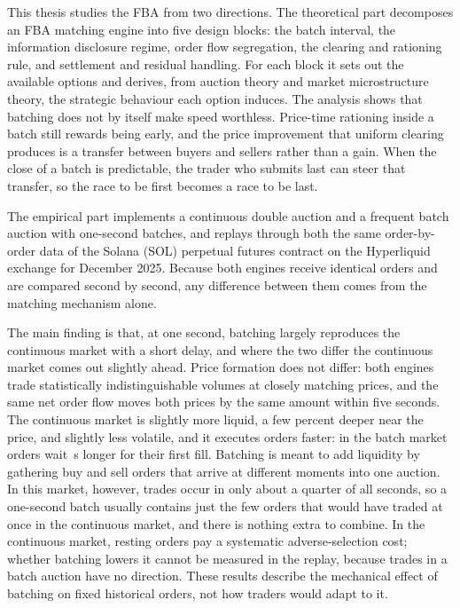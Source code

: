 This thesis studies the FBA from two directions. The theoretical part
decomposes an FBA matching engine into five design blocks: the batch
interval, the information disclosure regime, order flow segregation, the
clearing and rationing rule, and settlement and residual handling. For
each block it sets out the available options and derives, from auction
theory and market microstructure theory, the strategic behaviour each
option induces. The analysis shows that batching does not by itself make
speed worthless. Price-time rationing inside a batch still rewards being
early, and the price improvement that uniform clearing produces is a
transfer between buyers and sellers rather than a gain. When the close of
a batch is predictable, the trader who submits last can steer that
transfer, so the race to be first becomes a race to be last.

The empirical part implements a continuous double auction and a frequent
batch auction with one-second batches, and replays through both the same
order-by-order data of the Solana (SOL) perpetual futures contract on the
Hyperliquid exchange for December 2025. Because both engines receive
identical orders and are compared second by second, any difference
between them comes from the matching mechanism alone.

The main finding is that, at one second, batching largely reproduces the
continuous market with a short delay, and where the two differ the
continuous market comes out slightly ahead. Price formation does not
differ: both engines trade statistically indistinguishable volumes at
closely matching prices, and the same net order flow moves both prices by
the same amount within five seconds. The continuous market is slightly
more liquid, a few percent deeper near the price, and slightly less
volatile, and it executes orders faster: in the batch market orders wait
\ResTimeToExecDiff\,s longer for their first fill. Batching is meant to
add liquidity by gathering buy and sell orders that arrive at different
moments into one auction. In this market, however, trades occur in only
about a quarter of all seconds, so a one-second batch usually contains
just the few orders that would have traded at once in the continuous
market, and there is nothing extra to combine. In the continuous market, resting orders pay a
systematic adverse-selection cost; whether batching lowers it cannot be
measured in the replay, because trades in a batch auction have no
direction. These results describe the mechanical
effect of batching on fixed historical orders, not how traders would
adapt to it.

